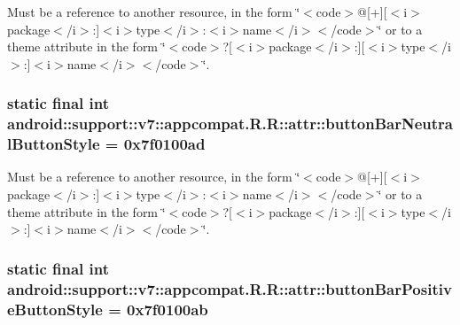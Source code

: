 Must be a reference to another resource, in the form \char`\"{}$<$code$>$@\mbox{[}+\mbox{]}\mbox{[}$<$i$>$package$<$/i$>$:\mbox{]}$<$i$>$type$<$/i$>$:$<$i$>$name$<$/i$>$$<$/code$>$\char`\"{} or to a theme attribute in the form \char`\"{}$<$code$>$?\mbox{[}$<$i$>$package$<$/i$>$:\mbox{]}\mbox{[}$<$i$>$type$<$/i$>$:\mbox{]}$<$i$>$name$<$/i$>$$<$/code$>$\char`\"{}. \hypertarget{classandroid_1_1support_1_1v7_1_1appcompat_1_1_r_1_1attr_67a8753e438b32065157c08c639ea54a}{
\subsubsection[{buttonBarNeutralButtonStyle}]{\setlength{\rightskip}{0pt plus 5cm}static final int android::support::v7::appcompat.R.R::attr::buttonBarNeutralButtonStyle = 0x7f0100ad}}
\label{classandroid_1_1support_1_1v7_1_1appcompat_1_1_r_1_1attr_67a8753e438b32065157c08c639ea54a}


Must be a reference to another resource, in the form \char`\"{}$<$code$>$@\mbox{[}+\mbox{]}\mbox{[}$<$i$>$package$<$/i$>$:\mbox{]}$<$i$>$type$<$/i$>$:$<$i$>$name$<$/i$>$$<$/code$>$\char`\"{} or to a theme attribute in the form \char`\"{}$<$code$>$?\mbox{[}$<$i$>$package$<$/i$>$:\mbox{]}\mbox{[}$<$i$>$type$<$/i$>$:\mbox{]}$<$i$>$name$<$/i$>$$<$/code$>$\char`\"{}. \hypertarget{classandroid_1_1support_1_1v7_1_1appcompat_1_1_r_1_1attr_0f772adb6d05d53cec9975bbca2f0e92}{
\subsubsection[{buttonBarPositiveButtonStyle}]{\setlength{\rightskip}{0pt plus 5cm}static final int android::support::v7::appcompat.R.R::attr::buttonBarPositiveButtonStyle = 0x7f0100ab}}
\label{classandroid_1_1support_1_1v7_1_1appcompat_1_1_r_1_1attr_0f772adb6d05d53cec9975bbca2f0e92}


